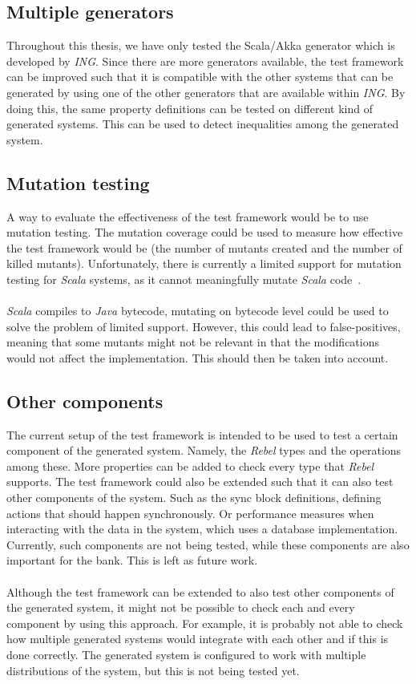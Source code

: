 \subsection*{Multiple generators}
Throughout this thesis, we have only tested the Scala/Akka generator which is
developed by \textit{ING}. Since there are more generators available, the test
framework can be improved such that it is
compatible with the other systems that can be generated by using one of the
other generators that are available within \textit{ING}. By doing this, the same
property definitions can be tested on different kind of generated systems. This
can be used to detect inequalities among the generated system.

\subsection*{Mutation testing}
A way to evaluate the effectiveness of the test framework would be to use
mutation testing. The mutation coverage could be used to measure how
effective the test framework would be (the number of mutants created and the
number of killed mutants). Unfortunately, there is currently a limited support
for mutation testing for \textit{Scala} systems, as it cannot meaningfully
mutate \textit{Scala} code~\cite{siteSbtPit2017}.\\
\\
\textit{Scala} compiles to \textit{Java} bytecode, mutating on bytecode level
could be used to solve the problem of limited support. However, this could lead
to false-positives, meaning that some mutants might not be relevant in that the
modifications would not affect the implementation. This should then be taken
into account.

\subsection*{Other components}
The current setup of the test framework is intended to be used to test a certain
component of the generated system. Namely, the \textit{Rebel} types and the
operations among these. More properties can be added to check every type that
\textit{Rebel} supports. The test framework could also be extended such that it
can also test other components of the system. Such as the sync block
definitions, defining actions that should happen synchronously. Or performance
measures when interacting with the data in the system, which uses a database
implementation. Currently, such components are not being tested, while these
components are also important for the bank. This is left as future work.\\
\\
Although the test framework can be extended to also test other components of
the generated system, it might not be possible to check each and every component
by using this approach. For example, it is probably not able to check how
multiple generated systems would integrate with each other and if this is done
correctly. The generated system is configured to work with multiple
distributions of the system, but this is not being tested yet.

